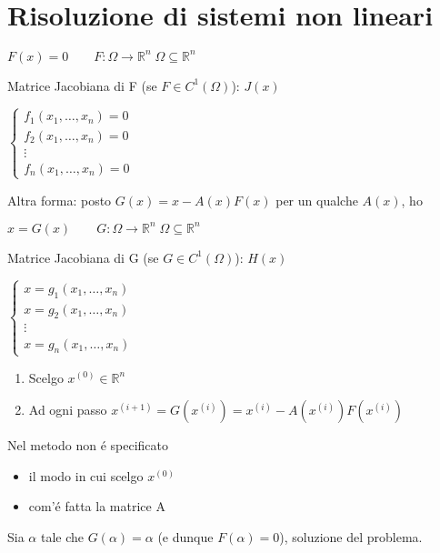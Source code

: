\chapter{Risoluzione di sistemi non lineari}
$ F(x) = 0 \qquad F:\Omega \rightarrow \mathbb{R}^n \; \Omega \subseteq \mathbb{R}^n $

Matrice Jacobiana di F (se $ F \in C^1(\Omega) $): $ J(x) $

$ \left\lbrace \begin{array}{c}
f_1(x_1, \ldots, x_n) = 0 \\ 
f_2(x_1, \ldots, x_n) = 0 \\ 
\vdots \\ 
f_n(x_1, \ldots, x_n) = 0
\end{array}  \right. $

\askip

Altra forma: posto $ G(x) = x - A(x)F(x) $ per un qualche $ A(x) $, ho

$ x = G(x) \qquad G:\Omega \rightarrow \mathbb{R}^n \; \Omega \subseteq \mathbb{R}^n $

Matrice Jacobiana di G (se $ G \in C^1(\Omega) $): $ H(x) $

$ \left\lbrace \begin{array}{c}
x = g_1(x_1, \ldots, x_n) \\ 
x = g_2(x_1, \ldots, x_n) \\ 
\vdots \\ 
x = g_n(x_1, \ldots, x_n)
\end{array}  \right. $

\askip

\begin{proc}\label{proc:genericosistnonlin}
\begin{enumerate}
\item Scelgo $ x^{(0)} \in \mathbb{R}^n $
\item Ad ogni passo $ x^{(i+1)} = G(x^{(i)}) = x^{(i)} - A(x^{(i)})F(x^{(i)}) $
\end{enumerate}
\end{proc}

Nel metodo non \'e specificato
\begin{itemize}
\item il modo in cui scelgo $ x^{(0)} $
\item com'\'e fatta la matrice A
\end{itemize}

\askip

Sia $ \alpha $ tale che $ G(\alpha) = \alpha $ (e dunque $ F(\alpha) = 0 $), soluzione del problema.

